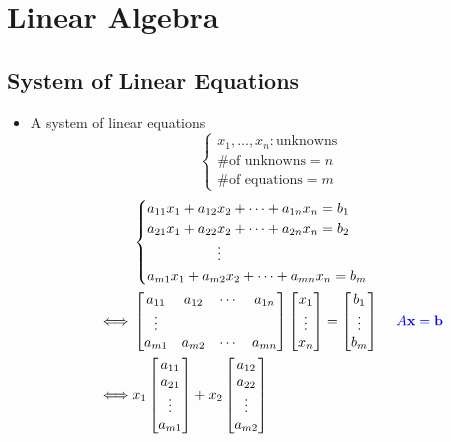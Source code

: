 \documentclass[12pt,openany]{book}
\theoremstyle{definition}
\begin{document}
	\chapter{Linear Algebra}
	\section{System of Linear Equations}
	\begin{itemize}
		\item A system of linear equations
		\[
		\begin{cases}
		x_1,\dots,x_n:\text{unknowns}\\
		\text{\# of unknowns}=n\\
		\text{\# of equations}=m
		\end{cases}
		\]
		\begin{align*}
		&\begin{cases}
		a_{11}x_1+a_{12}x_2+\cdots+a_{1n}x_n=b_1\\
		a_{21}x_1+a_{22}x_2+\cdots+a_{2n}x_n=b_2\\
		\hspace{50pt}\vdots\\
		a_{m1}x_1+a_{m2}x_2+\cdots+a_{mn}x_n=b_m\\
		\end{cases}\\
		\iff&\begin{bmatrix}
		a_{11} & a_{12} & \cdots & a_{1n}\\
		\vdots \\
		a_{m1} & a_{m2} &\cdots & a_{mn}
		\end{bmatrix}\begin{bmatrix}
		x_1\\ \vdots \\ x_n
		\end{bmatrix}=\begin{bmatrix}
		b_1\\ \vdots \\ b_m
		\end{bmatrix} &\textcolor{blue}{A\textbf{x}=\textbf{b}}\\
		\iff& x_1\begin{bmatrix}
		a_{11}\\ a_{21}\\ \vdots\\ a_{m1}
		\end{bmatrix}+x_2\begin{bmatrix}
		a_{12}\\ a_{22}\\ \vdots\\ a_{m2}

\end{bmatrix}
\end{align*}
\end{itemize}
\end{document}
